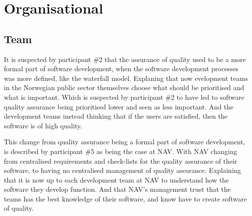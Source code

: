 
\section{Organisational}
\subsection{Team}
It is suspected by participant \#2 that the assurance of quality used to be a more formal part of software development, when the software development processes was more defined, like the waterfall model. Explaning that now evelopment teams in the Norwegian public sector themselves choose what should be prioritised and what is important. Which is suspected by participant \#2 to have led to software quality assurance being prioritised lower and seen as less important. And the development teams instead thinking that if the users are satisfied, then the software is of high quality.


This change from quality assurance being a formal part of software development, is described by participant \#5 as being the case at NAV. With NAV changing from centralised requirements and check-lists for the quality assurance of their software, to having no centralised management of quality assurance. Explaining that it is now up to each development team at NAV to understand how the software they develop function. And that NAV's management trust that the teams has the best knowledge of their software, and know have to create software of quality.


